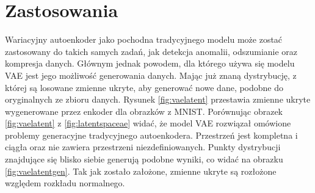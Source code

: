 \documentclass[a4paper,12pt,oneside]{book} %
\begin{document}
\section{Zastosowania}
Wariacyjny autoenkoder jako pochodna tradycyjnego modelu może zostać zastosowany do takich samych zadań, jak detekcja anomalii, odszumianie oraz kompresja danych. Głównym jednak powodem, dla którego używa się modelu VAE jest jego możliwość generowania danych. Mając już znaną dystrybucję, z której są losowane zmienne ukryte, aby generować nowe dane, podobne do oryginalnych ze zbioru danych. Rysunek \ref{fig:vaelatent} przestawia zmienne ukryte wygenerowane przez enkoder dla obrazków z MNIST. Porównując obrazek \ref{fig:vaelatent} z \ref{fig:latentspaceae} widać, że model VAE rozwiązał omówione problemy generacyjne tradycyjnego autoenkodera. Przestrzeń jest kompletna i ciągła oraz nie zawiera przestrzeni niezdefiniowanych. Punkty dystrybucji znajdujące się blisko siebie generują podobne wyniki, co widać na obrazku \ref{fig:vaelatentgen}. Tak jak zostało założone, zmienne ukryte są rozłożone względem rozkładu normalnego. 
\end{document}
